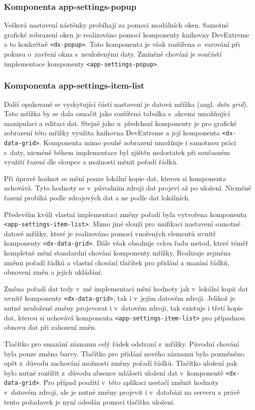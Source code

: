 \subsubsection*{Komponenta app-settings-popup}
Veškerá nastavení nástěnky probíhají za pomoci modálních oken. Samotné grafické zobrazení oken je realizováno pomocí komponenty knihovny DevExtreme a to konkrétně \texttt{<dx-popup>}. Tato komponenta je však rozšířena o~varování při pokusu o~zavření okna s~neuloženými daty. Zmíněné chování je součástí implementace komponenty \texttt{<app-settings-popup>}.


\subsubsection*{Komponenta app-settings-item-list}
Další opakovaně se vyskytující částí nastavení je datová mřížka (angl. \emph{data grid}). Tato mřížka by se dala označit jako rozšířená tabulka s~akcemi umožňující manipulaci a editaci dat. Stejně jako u~předchozí komponenty je pro grafické zobrazení této mřížky využita knihovna DevExtreme a její komponenta \texttt{<dx-data-grid>}. Komponenta mimo pouhé zobrazení umožňuje i samotnou práci s~daty, nicméně během implementace byl zjištěn nedostatek při současném využití řazení dle sloupce a možnosti měnit pořadí řádků.

Při úpravě hodnot se mění pouze lokální kopie dat, kterou si komponenta uchovává. Tyto hodnoty se v~původním zdroji dat projeví až po uložení. Nicméně řazení probíhá podle zdrojových dat a ne podle dat lokálních.

Především kvůli vlastní implementaci změny pořadí byla vytvořena komponenta \texttt{<app-settings-item-list>}. Mimo jiné slouží pro unifikaci nastavení samotné datové mřížky, které je realizováno pomocí vnořených elementů uvnitř komponenty \texttt{<dx-data-grid>}. Dále však obsahuje celou řadu metod, které téměř kompletně mění standardní chování komponenty mřížky. Realizuje zejména změnu pořadí řádků a vlastní chování tlačítek pro přidání a mazání řádků, obnovení změn a jejich ukládání.

Změna pořadí dat tedy v~mé implementaci mění hodnoty jak v~lokální kopii dat uvnitř komponenty \texttt{<dx-data-grid>}, tak i v~jejím datovém zdroji. Jelikož je nutné neuložené změny projevovat i v~datovém zdroji, tak existuje i třetí kopie dat, kterou si uchovává komponenta \texttt{<app-settings-item-list>} pro případnou obnovu dat při zahození změn.

Tlačítko pro smazání záznamu celý řádek odstraní z~mřížky. Původní chování byla pouze změna barvy. Tlačítko pro přidání nového záznamu bylo pozměněno opět z~důvodu zachování možnosti změny pořadí řádků. Tlačítko uložení pak bylo nutné rozšířit z~důvodu absence události uložení dat v~komponentě \texttt{<dx-data-grid>}. Pro případ použití v~této aplikaci nestačí změnit hodnoty v~datovém zdroji, ale je nutné změny projevit i v~databázi na serveru a právě tento požadavek je nyní odeslán pomocí tlačítka uložení. 


